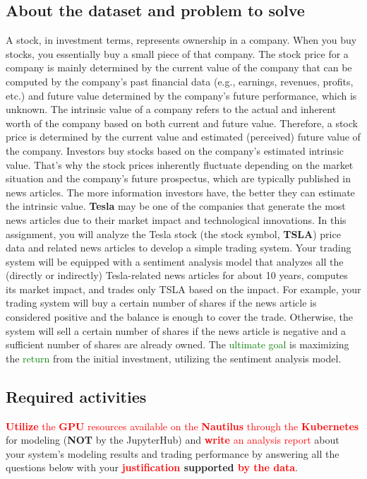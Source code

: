 \documentclass[twocolumn,10pt]{article}
\begin{document}
\begin{multicols}{2}
\begin{flushleft}
\subsection*{About the dataset and problem to solve}
A stock, in investment terms, represents ownership in a company. When you buy stocks, you essentially buy a small piece of that company. The stock price for a company is mainly determined by the current value of the company that can be computed by the company’s past financial data (e.g., earnings, revenues, profits, etc.) and future value determined by the company’s future performance, which is unknown. The intrinsic value of a company refers to the actual and inherent worth of the company based on both current and future value. Therefore, a stock price is determined by the current value and estimated (perceived) future value of the company. Investors buy stocks based on the company’s estimated intrinsic value. That’s why the stock prices inherently fluctuate depending on the market situation and the company’s future prospectus, which are typically published in news articles. The more information investors have, the better they can estimate the intrinsic value.
\textbf{Tesla} may be one of the companies that generate the most news articles due to their market impact and technological innovations. In this assignment, you will analyze the Tesla stock (the stock symbol, \textbf{TSLA}) price data and related news articles to develop a simple trading system. Your trading system will be equipped with a sentiment analysis model that analyzes all the (directly or indirectly) Tesla-related news articles for about 10 years, computes its market impact, and trades only TSLA based on the impact. For example, your trading system will buy a certain number of shares if the news article is considered positive and the balance is enough to cover the trade. Otherwise, the system will sell a certain number of shares if the news article is negative and a sufficient number of shares are already owned. The \textcolor{green}{ultimate goal} is maximizing the \textcolor{green}{return} from the initial investment, utilizing the sentiment analysis model.

\subsection*{Required activities}
\textcolor{red}{\textbf{Utilize} the \textbf{GPU} resources available on the \textbf{Nautilus} through the \textbf{Kubernetes}} for modeling (\textbf{NOT} by the JupyterHub) and \textcolor{red}{\textbf{write} an analysis report} about your system's modeling results and trading performance by answering all the questions below with your \textbf{\textcolor{red}{justification} supported \textcolor{red}{by the data}}.


\end{flushleft}
\end{multicols}
\end{document}
